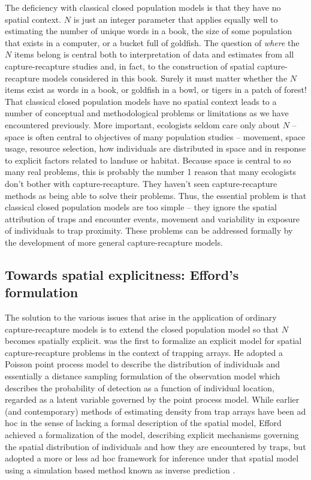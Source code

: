The deficiency with classical closed population models is that they
have no spatial context. $N$ is just an integer parameter that applies
equally well to estimating the number of unique words in a book, the
size of some population that exists in a computer, or a bucket full of
goldfish.  The question of {\it where} the $N$ items belong is central
both to interpretation of data and estimates from all
capture-recapture studies and, in fact, to the construction of spatial
capture-recapture models considered in this book.  Surely it must
matter whether the $N$ items exist as words in a book, or goldfish in
a bowl, or tigers in a patch of forest! That classical closed
population models have no spatial context leads to a number of
conceptual and methodological problems or limitations as we have
encountered previously. More important, ecologists seldom care only
about $N$ -- space is often central to objectives of many population
studies -- movement, space usage, resource selection, how individuals
are distributed in space and in response to explicit factors related
to landuse or habitat. Because space is central to so many real
problems, this is probably the number 1 reason that many ecologists
don't bother with capture-recapture. They haven't seen
capture-recapture methods as being able to solve their problems.
Thus, the essential problem is that classical closed population models
are too simple -- they ignore the spatial attribution of traps and
encounter events, movement and variability in exposure of individuals
to trap proximity.
These problems can be addressed formally by the
development of more general capture-recapture models.



\subsection{Towards spatial explicitness: Efford's formulation}


The solution to the various issues that arise in the application of
ordinary capture-recapture models is to extend the closed population
model so that $N$ becomes spatially explicit.
\citet{efford:2004} was the first to formalize an explicit model for
spatial capture-recapture problems in the context of trapping arrays.
He adopted a Poisson point process model to describe the distribution
of individuals and essentially a distance sampling formulation of the
observation model which describes the probability of detection as a
function of individual location, regarded as a latent variable
governed by the point process model. While earlier (and contemporary)
methods of estimating density from trap arrays have been ad hoc in the
sense of lacking a formal description of the spatial model, Efford
achieved a formalization of the model, describing explicit mechanisms
governing the spatial distribution of individuals and how they are
encountered by traps, but adopted a more or less ad hoc framework for
inference under that spatial model using a simulation based method
known as inverse prediction \citep{gopalaswamy:2012}.

